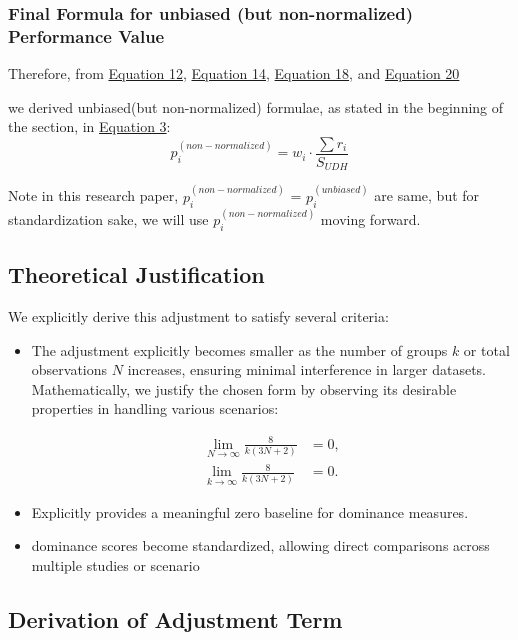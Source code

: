 \documentclass[man,floatsintext]{apa7}
\begin{document}
\subsubsection{Final Formula for unbiased (but non-normalized) Performance Value}
Therefore, from \hyperref[eq:SUDH]{Equation 12}, \hyperref[eq:p-biased]{Equation 14},  \hyperref[eq:p-unbiased]{Equation 18}, and \hyperref[eq:weight-bias]{Equation 20}

we derived unbiased(but non-normalized) formulae, as stated in the beginning of the section, in \hyperref[eq:non-normalized]{Equation 3}:
\begin{equation}
    p_i^{(non-normalized)} = w_i \cdot \frac{\sum r_i}{ S_{UDH} }
\end{equation}

Note in this research paper, $p_i^{(non-normalized)}$ = $p_i^{(unbiased)}$ are same, but for standardization sake, we will use $p_i^{(non-normalized)}$ moving forward.


\subsection{Theoretical Justification}

We explicitly derive this adjustment to satisfy several criteria:
\begin{itemize}
    \item The adjustment explicitly becomes smaller as the number of groups $k$ or total observations $N$ increases, ensuring minimal interference in larger datasets.
    Mathematically, we justify the chosen form by observing its desirable properties in handling various scenarios:

\begin{align*}
\lim_{N \to \infty} \frac{8}{k(3N+2)} &= 0, \\
\lim_{k \to \infty} \frac{8}{k(3N+2)} &= 0.
\end{align*}
    \item Explicitly provides a meaningful zero baseline for dominance measures.
    \item dominance scores become standardized, allowing direct comparisons across multiple studies or scenario
\end{itemize}




\subsection*{Derivation of Adjustment Term}
\end{document}
